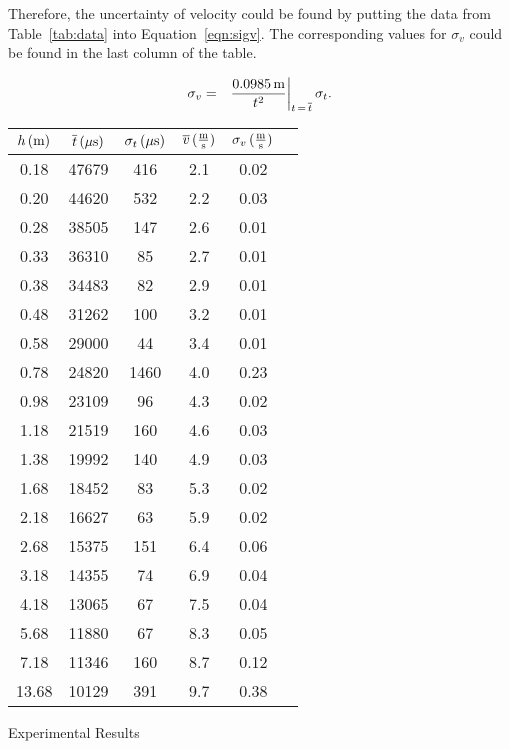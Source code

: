 \documentclass{article}
\begin{document}
\noindent Therefore, the uncertainty of velocity could be found by putting the data from Table~\ref{tab:data} into Equation~\ref{eqn:sigv}. The corresponding values for $\sigma_{v}$ could be found in the last column of the table.

\begin{eqnarray}
\sigma_{v}&=&\frac{0.0985\,\textnormal{m}}{t^{2}}\bigg|_{t\,=\,\overline{t}}\,\sigma_{t}. 
\label{eqn:sigv}
\end{eqnarray} 

\begin{center}
 \label{tab:data}
\begin{tabular}{|c|c|c|c|c|c|}
\hline
$h\,(\textnormal{m})$ & $\overline{t}\,(\mu{\textnormal{s}})$ & $\sigma_{t}\,(\mu{\textnormal{s}})$ & $\overline{v}\,(\frac{\textnormal{m}}{\textnormal{s}})$ & $\sigma_{v}\,(\frac{\textnormal{m}}{\textnormal{s}})$ \\ \hline
0.18 & 47679 & 416 & 2.1 & 0.02 \\ \hline
0.20 & 44620 & 532 & 2.2 & 0.03 \\ \hline
0.28 & 38505 & 147 & 2.6 & 0.01 \\ \hline
0.33 & 36310 & 85 & 2.7 & 0.01 \\ \hline
0.38 & 34483 & 82 & 2.9 & 0.01 \\ \hline
0.48 & 31262 & 100 & 3.2 & 0.01 \\ \hline
0.58 & 29000 & 44 & 3.4 & 0.01 \\ \hline
0.78 & 24820 & 1460 & 4.0 & 0.23 \\ \hline
0.98 & 23109 & 96 & 4.3 & 0.02 \\ \hline
1.18 & 21519 & 160 & 4.6 & 0.03 \\ \hline
1.38 & 19992 & 140 & 4.9 & 0.03 \\ \hline
1.68 & 18452 & 83 & 5.3 & 0.02 \\ \hline
2.18 & 16627 & 63 & 5.9 & 0.02 \\ \hline
2.68 & 15375 & 151 & 6.4 & 0.06 \\ \hline
3.18 & 14355 & 74 & 6.9 & 0.04 \\ \hline
4.18 & 13065 & 67 & 7.5 & 0.04 \\ \hline
5.68 & 11880 & 67 & 8.3 & 0.05 \\ \hline
7.18 & 11346 & 160 & 8.7 & 0.12 \\ \hline
13.68 & 10129 & 391 & 9.7 & 0.38 \\ \hline
\end{tabular} \par
\bigskip
Experimental Results
\end{center}
\end{document}
